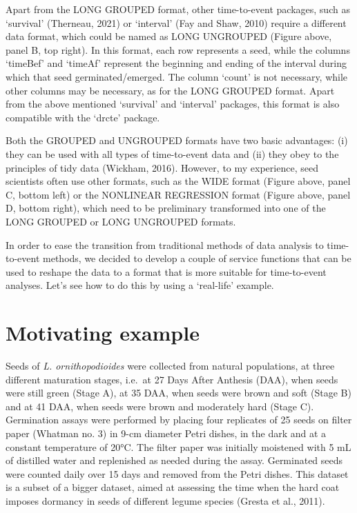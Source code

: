 \documentclass[
]{book}
\begin{document}
Apart from the LONG GROUPED format, other time-to-event packages, such as `survival' (Therneau, 2021) or `interval' (Fay and Shaw, 2010) require a different data format, which could be named as LONG UNGROUPED (Figure above, panel B, top right). In this format, each row represents a seed, while the columns `timeBef' and `timeAf' represent the beginning and ending of the interval during which that seed germinated/emerged. The column `count' is not necessary, while other columns may be necessary, as for the LONG GROUPED format. Apart from the above mentioned `survival' and `interval' packages, this format is also compatible with the `drcte' package.

Both the GROUPED and UNGROUPED formats have two basic advantages: (i) they can be used with all types of time-to-event data and (ii) they obey to the principles of tidy data (Wickham, 2016). However, to my experience, seed scientists often use other formats, such as the WIDE format (Figure above, panel C, bottom left) or the NONLINEAR REGRESSION format (Figure above, panel D, bottom right), which need to be preliminary transformed into one of the LONG GROUPED or LONG UNGROUPED formats.

In order to ease the transition from traditional methods of data analysis to time-to-event methods, we decided to develop a couple of service functions that can be used to reshape the data to a format that is more suitable for time-to-event analyses. Let's see how to do this by using a `real-life' example.

\hypertarget{motivating-example}{%
\section{Motivating example}\label{motivating-example}}

Seeds of \emph{L. ornithopodioides} were collected from natural populations, at three different maturation stages, i.e.~at 27 Days After Anthesis (DAA), when seeds were still green (Stage A), at 35 DAA, when seeds were brown and soft (Stage B) and at 41 DAA, when seeds were brown and moderately hard (Stage C). Germination assays were performed by placing four replicates of 25 seeds on filter paper (Whatman no. 3) in 9-cm diameter Petri dishes, in the dark and at a constant temperature of 20°C. The filter paper was initially moistened with 5 mL of distilled water and replenished as needed during the assay. Germinated seeds were counted daily over 15 days and removed from the Petri dishes. This dataset is a subset of a bigger dataset, aimed at assessing the time when the hard coat imposes dormancy in seeds of different legume species (Gresta et al., 2011).
\end{document}
